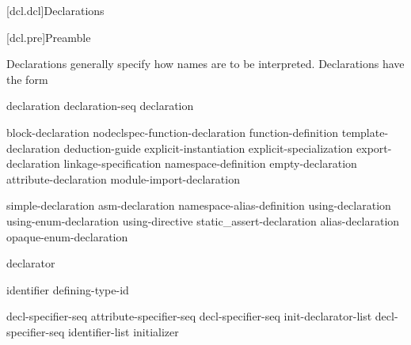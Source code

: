 [dcl.dcl]{Declarations}%



[dcl.pre]{Preamble}

\pnum
Declarations generally specify how names are to be interpreted. Declarations have
the form
\begin{bnf}
\br
    declaration\br
    declaration-seq declaration
\end{bnf}

\begin{bnf}
\br
    block-declaration\br
    nodeclspec-function-declaration\br
    function-definition\br
    template-declaration\br
    deduction-guide\br
    explicit-instantiation\br
    explicit-specialization\br
    export-declaration\br
    linkage-specification\br
    namespace-definition\br
    empty-declaration\br
    attribute-declaration\br
    module-import-declaration
\end{bnf}

\begin{bnf}
\br
    simple-declaration\br
    asm-declaration\br
    namespace-alias-definition\br
    using-declaration\br
    using-enum-declaration\br
    using-directive\br
    static_assert-declaration\br
    alias-declaration\br
    opaque-enum-declaration
\end{bnf}

\begin{bnf}
\br
     declarator \terminal{;}
\end{bnf}

\begin{bnf}
\br
     identifier  \terminal{=} defining-type-id \terminal{;}
\end{bnf}

\begin{bnf}
\br
    decl-specifier-seq  \terminal{;}\br
    attribute-specifier-seq decl-specifier-seq init-declarator-list \terminal{;}\br
     decl-specifier-seq  \terminal{[} identifier-list \terminal{]} initializer \terminal{;}
\end{bnf}

